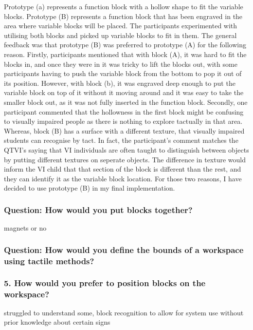 \documentclass[oneside,%
                    author={Malak Hajji},
                    degree={BSc},
                    title={Designing An Accessible Computational Toolkit For Students},
                  subtitle={With Mixed Visual Abilities}]{dissertation}
\begin{document}
Prototype (a) represents a function block with a hollow shape to fit the variable blocks. Prototype (B) represents a function block that has been engraved in the area where variable blocks will be placed. 
The participants experimented with utilising both blocks and picked up variable blocks to fit in them. 
The general feedback was that prototype (B) was preferred to prototype (A) for the following reason. Firstly, participants mentioned that with block (A), it was hard to fit the blocks in, and once they were in it was tricky to lift the blocks out, with some participants having to push the variable block from the bottom to pop it out of its position. However, with block (b), it was engraved deep enough to put the variable block on top of it without it moving around and it was easy to take the smaller block out, as it was not fully inserted in the function block. Secondly, one participant commented that the hollowness in the first block might be confusing to visually impaired people as there is nothing to explore tactually in that area. Whereas, block (B) has a surface with a different texture, that visually impaired students can recognise by tact. In fact, the participant's comment matches the QTVI's saying that VI individuals are often taught to distinguish between objects by putting different textures on seperate objects. The difference in texture would inform the VI child that that section of the block is different than the rest, and they can identify it as the variable block location.
For those two reasons, I have decided to use prototype (B) in my final implementation.

\subsubsection{Question: How would you put blocks together?}
magnets or no




\subsubsection{Question: How would you define the bounds of a workspace using tactile methods?}

\subsubsection{5. How would you prefer to position blocks on the workspace?}



struggled to understand some, block recognition to allow for system use without prior knowledge about certain signs
\end{document}
